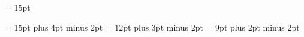 \def\utfeightchardefs{%
  \let\DeclareUnicodeCharacter\DeclareUnicodeCharacterUTFviii
  \unicodechardefs
}

\newif\ifpassthroughchars
\passthroughcharsfalse

%
\def\DeclareUnicodeCharacterNative#1#2{%
  \catcode"#1=\active
  \def\dodeclareunicodecharacternative##1##2##3{%
    \begingroup
      \uccode`\~="##2\relax
      \uppercase{\gdef~}{%
        \ifpassthroughchars
          ##1%
        \else
          ##3%
        \fi
      }
    \endgroup
  }
  \begingroup
    \uccode`\.="#1\relax
    \uppercase{\def\UTFNativeTmp{.}}%
    \expandafter\dodeclareunicodecharacternative\UTFNativeTmp{#1}{#2}%
  \endgroup
}

\def\nativeunicodechardefs{%
  \let\DeclareUnicodeCharacter\DeclareUnicodeCharacterNative
  \unicodechardefs
}

\def\DeclareUnicodeCharacterNativeAtU#1#2{%
  \def\UTFAtUTmp{#2}
  \expandafter\globallet\csname uni:#1\endcsname \UTFAtUTmp
}

\def\nativeunicodechardefsatu{%
  \let\DeclareUnicodeCharacter\DeclareUnicodeCharacterNativeAtU
  \unicodechardefs
}

\def\asciichardefs{%
   \relax
}

\iftxinativeunicodecapable
  \nativeunicodechardefsatu
\else
  \utfeightchardefs
\fi


\newdimen{} {} = 15pt

\chapheadingskip = 15pt plus 4pt minus 2pt
\secheadingskip = 12pt plus 3pt minus 2pt
\subsecheadingskip = 9pt plus 2pt minus 2pt

